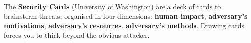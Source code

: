 \begin{defnbox}[title={Brainstorming with security cards}]
The \textbf{Security Cards} (University of Washington) are a deck of cards to brainstorm threats,
organised in four dimensions: \textbf{human impact}, \textbf{adversary's motivations},
\textbf{adversary's resources}, \textbf{adversary's methods}. Drawing cards forces you to think
beyond the obvious attacker.
\end{defnbox}
